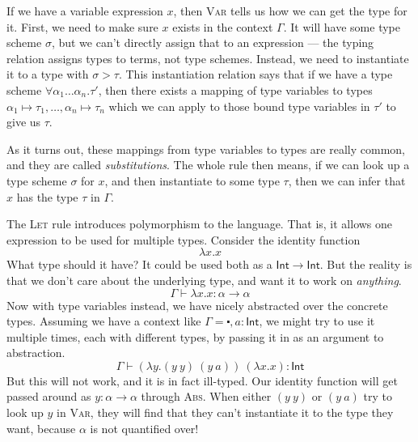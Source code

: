 If we have a variable expression $x$, then \textsc{Var} tells us how
we can get the type for it. First, we need to make sure $x$ exists in
the context $\Gamma$. It will have some type scheme $\sigma$, but we can't
directly assign that to an expression --- the typing relation assigns
types to terms, not type schemes. Instead, we need to instantiate it
to a type with $\sigma > \tau$. This instantiation relation says that if we
have a type scheme $\forall \alpha_1\ldots\alpha_n . \tau'$, then there exists a mapping of
type variables to types
${\alpha_1\mapsto\tau_1,\ldots,\alpha_n\mapsto\tau_n}$ which we can apply to those bound type variables
in $\tau'$ to give us $\tau$.

As it turns out, these mappings from type
variables to types are really common, and they are called
\emph{substitutions}.  The whole rule then means, if we can look up a
type scheme $\sigma$ for $x$, and then instantiate to some type
$\tau$, then we can infer that $x$ has the type $\tau$ in $\Gamma$.

The \textsc{Let} rule introduces polymorphism to the language. That
is, it allows one expression to be used for multiple types. Consider
the identity function
\[ \lambda x . x \]
What type should it have? It could be used both as a
$\mathsf{Int} \rightarrow \mathsf{Int}$. But the reality is that we don't care
about the underlying type, and want it to work on \emph{anything}.
\[ \Gamma \vdash \lambda x . x : \alpha \rightarrow \alpha \] Now with type variables instead, we have
nicely abstracted over the concrete types. Assuming we have a context
like $\Gamma = \centerdot , a : \mathsf{Int}$, we might try to use it multiple
times, each with different types, by passing it in as an argument to
abstraction.
\[ \Gamma \vdash (\lambda y . (y \ y) \ (y \ a)) \ (\lambda x . x) : \mathsf{Int} \]
But this will not work, and it is in fact ill-typed. Our identity
function will get passed around as ${y : \alpha \rightarrow \alpha}$ through \textsc{Abs}. When
either $(y \ y)$ or $(y \ a)$ try to look up $y$ in \textsc{Var}, they
will find that they can't instantiate it to the type they want,
because $\alpha$ is not quantified over!

